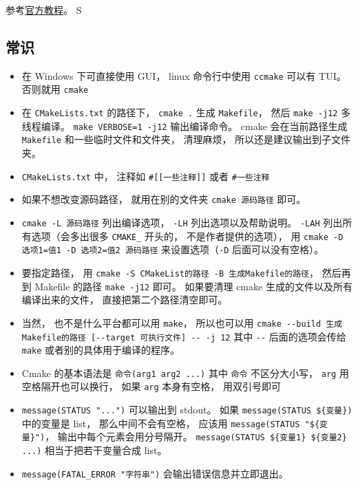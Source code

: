 
\begin{issues}
\issueDraft
\end{issues}


参考\href{https://cmake.org/cmake/help/latest/guide/tutorial/index.html}{官方教程}。
S
\subsection{常识}
\begin{itemize}
\item 在 Windows 下可直接使用 GUI， linux 命令行中使用 \verb`ccmake` 可以有 TUI。 否则就用 \verb`cmake`
\item 在 \verb|CMakeLists.txt| 的路径下， \verb`cmake .` 生成 \verb|Makefile|， 然后 \verb|make -j12| 多线程编译。 \verb|make VERBOSE=1 -j12| 输出编译命令。 cmake 会在当前路径生成 \verb|Makefile| 和一些临时文件和文件夹， 清理麻烦， 所以还是建议输出到子文件夹。
\item \verb|CMakeLists.txt| 中， 注释如 \verb|#[[一些注释]]| 或者 \verb|#一些注释|
\item 如果不想改变源码路径， 就用在别的文件夹 \verb|cmake 源码路径| 即可。
\item \verb|cmake -L 源码路径| 列出编译选项， \verb|-LH| 列出选项以及帮助说明。 \verb|-LAH| 列出所有选项（会多出很多 \verb|CMAKE_| 开头的， 不是作者提供的选项）， 用 \verb|cmake -D 选项1=值1 -D 选项2=值2 源码路径| 来设置选项（\verb|-D| 后面可以没有空格）。
\item 要指定路径， 用 \verb|cmake -S CMakeList的路径 -B 生成Makefile的路径|， 然后再到 Makefile 的路径 \verb|make -j12| 即可。 如果要清理 cmake 生成的文件以及所有编译出来的文件， 直接把第二个路径清空即可。
\item 当然， 也不是什么平台都可以用 \verb|make|， 所以也可以用 \verb|cmake --build 生成Makefile的路径 [--target 可执行文件] -- -j 12| 其中 \verb|--| 后面的选项会传给 \verb|make| 或者别的具体用于编译的程序。
\item Cmake 的基本语法是 \verb`命令(arg1 arg2 ...)` 其中 \verb|命令| 不区分大小写， \verb`arg` 用空格隔开也可以换行， 如果 \verb|arg| 本身有空格， 用双引号即可
\item \verb`message(STATUS "...")` 可以输出到 stdout。 如果 \verb`message(STATUS ${变量})` 中的变量是 list， 那么中间不会有空格， 应该用 \verb`message(STATUS "${变量}")`， 输出中每个元素会用分号隔开。 \verb`message(STATUS ${变量1} ${变量2} ...)` 相当于把若干变量合成 list。
\item \verb|message(FATAL_ERROR "字符串")| 会输出错误信息并立即退出。

\end{itemize}
